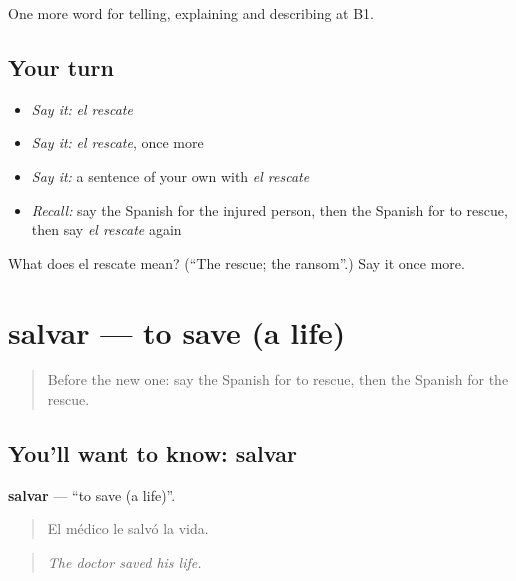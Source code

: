 \begin{grammarlens}[title={What you've built}]
One more word for telling, explaining and describing at B1.
\end{grammarlens}

\subsection*{Your turn}
\begin{itemize}
\raggedright
  \item \emph{Say it:} \emph{el rescate}
  \item \emph{Say it:} \emph{el rescate}, once more
  \item \emph{Say it:} a sentence of your own with \emph{el rescate}
  \item \emph{Recall:} say the Spanish for the injured person, then the Spanish for to rescue, then say \emph{el rescate} again
\end{itemize}

\begin{tcolorbox}[breakable,colback=teal!4,colframe=teal!35!black,title={Before you move on}]
What does el rescate mean? (\textquotedblleft{}The rescue; the ransom\textquotedblright{}.) Say it once more.
\end{tcolorbox}
\section[salvar]{salvar — to save (a life)}

\label{lesson:ES-C526-salvar}



\begin{quote}
Before the new one: say the Spanish for to rescue, then the Spanish for the rescue.
\end{quote}

\subsection*{You'll want to know: salvar}
\textbf{salvar} — \textquotedblleft{}to save (a life)\textquotedblright{}.

\begin{quote}
El médico le salvó la vida.
\end{quote}

\begin{quote}
\emph{The doctor saved his life.}
\end{quote}

